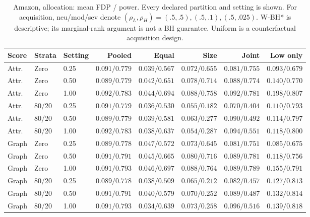 \begin{table}[t]\centering\scriptsize\setlength{\tabcolsep}{3pt}
\caption{Amazon, allocation: mean FDP / power. Every declared partition and setting is shown. For acquisition, neu/mod/sev denote $(\rho_L,\rho_H)=(.5,.5),(.5,.1),(.5,.025)$. W-BH* is descriptive; its marginal-rank argument is not a BH guarantee. Uniform is a counterfactual acquisition design.}
\begin{tabular}{lllrrrrr}\toprule Score & Strata & Setting & Pooled & Equal & Size & Joint & Low only\\\midrule
Attr. & Zero & 0.25 & $0.091/0.779$ & $0.039/0.567$ & $0.072/0.655$ & $0.081/0.755$ & $0.093/0.679$ \\
Attr. & Zero & 0.50 & $0.089/0.779$ & $0.042/0.651$ & $0.078/0.714$ & $0.088/0.774$ & $0.140/0.770$ \\
Attr. & Zero & 1.00 & $0.092/0.783$ & $0.044/0.694$ & $0.088/0.758$ & $0.092/0.781$ & $0.198/0.807$ \\
Attr. & 80/20 & 0.25 & $0.091/0.779$ & $0.036/0.530$ & $0.055/0.182$ & $0.070/0.404$ & $0.110/0.793$ \\
Attr. & 80/20 & 0.50 & $0.089/0.779$ & $0.039/0.581$ & $0.063/0.277$ & $0.090/0.492$ & $0.114/0.797$ \\
Attr. & 80/20 & 1.00 & $0.092/0.783$ & $0.038/0.637$ & $0.054/0.287$ & $0.094/0.551$ & $0.118/0.800$ \\
Graph & Zero & 0.25 & $0.089/0.778$ & $0.047/0.572$ & $0.073/0.645$ & $0.081/0.751$ & $0.085/0.675$ \\
Graph & Zero & 0.50 & $0.091/0.791$ & $0.045/0.665$ & $0.080/0.716$ & $0.089/0.781$ & $0.118/0.756$ \\
Graph & Zero & 1.00 & $0.091/0.793$ & $0.046/0.697$ & $0.088/0.764$ & $0.089/0.789$ & $0.155/0.791$ \\
Graph & 80/20 & 0.25 & $0.089/0.778$ & $0.038/0.509$ & $0.065/0.212$ & $0.082/0.457$ & $0.127/0.813$ \\
Graph & 80/20 & 0.50 & $0.091/0.791$ & $0.040/0.579$ & $0.070/0.252$ & $0.089/0.487$ & $0.132/0.814$ \\
Graph & 80/20 & 1.00 & $0.091/0.793$ & $0.034/0.639$ & $0.073/0.258$ & $0.096/0.516$ & $0.139/0.818$ \\
\bottomrule\end{tabular}\end{table}

